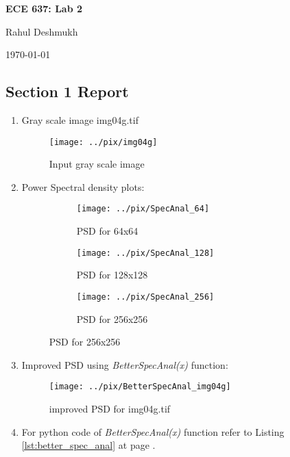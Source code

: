\documentclass[a4paper,11pt]{article}
\newcommand{\reflst}[1]{Listing \ref{#1} at page \pageref{#1}}
\begin{document}
\begin{center}
\Large{\textbf{ECE 637: Lab 2}}

Rahul Deshmukh

\today
\end{center}

\subsection*{Section 1 Report} 

\begin{enumerate}
\item Gray scale image img04g.tif
\begin{figure}[!hp]
 \centering
 \texttt{[image: ../pix/img04g]}
 \caption{Input gray scale image}
\end{figure}

\newpage
\item Power Spectral density plots:
\begin{figure}[!hp]
 \centering
 \begin{subfigure}[b]{0.9\textwidth}
  \centering
  \texttt{[image: ../pix/SpecAnal\_64]}
  \caption{PSD for 64x64}
 \end{subfigure}
\begin{subfigure}[b]{0.9\textwidth}
  \centering
  \texttt{[image: ../pix/SpecAnal\_128]}
  \caption{PSD for 128x128}
 \end{subfigure}
 \begin{subfigure}[b]{0.9\textwidth}
   \centering
  \texttt{[image: ../pix/SpecAnal\_256]}
  \caption{PSD for 256x256}
 \end{subfigure}
\end{figure}


\newpage
\item Improved PSD using \textit{BetterSpecAnal(x)} function:
\begin{figure}[!hp]
 \centering
 \texttt{[image: ../pix/BetterSpecAnal\_img04g]}
 \caption{improved PSD for img04g.tif}
\end{figure}

\item For python code of \textit{BetterSpecAnal(x)} function refer to \reflst{lst:better_spec_anal}.
\end{enumerate}

%
\clearpage
\vspace{2ex}
%
\end{document}
